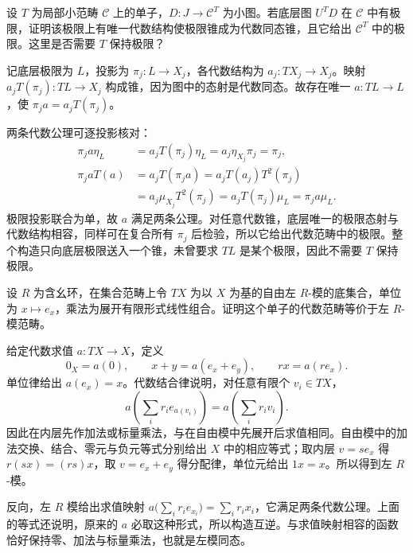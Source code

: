 \begin{exercise}\label{b4:ex:A-em-limits}
	设 \(T\) 为局部小范畴 \(\mathcal C\) 上的单子，\(D:J\to\mathcal C^T\) 为小图。若底层图 \(U^TD\) 在 \(\mathcal C\) 中有极限，证明该极限上有唯一代数结构使极限锥成为代数同态锥，且它给出 \(\mathcal C^T\) 中的极限。这里是否需要 \(T\) 保持极限？
\end{exercise}
\begin{solution}
	记底层极限为 \(L\)，投影为 \(\pi_j:L\to X_j\)，各代数结构为 \(a_j:TX_j\to X_j\)。映射 \(a_jT(\pi_j):TL\to X_j\) 构成锥，因为图中的态射是代数同态。故存在唯一 \(a:TL\to L\)，使 \(\pi_ja=a_jT(\pi_j)\)。

	两条代数公理可逐投影核对：
	\[
		\begin{aligned}
			\pi_ja\eta_L&=a_jT(\pi_j)\eta_L=a_j\eta_{X_j}\pi_j=\pi_j,\\
			\pi_jaT(a)&=a_jT(\pi_ja)=a_jT(a_j)T^2(\pi_j)\\
			&=a_j\mu_{X_j}T^2(\pi_j)=a_jT(\pi_j)\mu_L=\pi_ja\mu_L.
		\end{aligned}
	\]极限投影联合为单，故 \(a\) 满足两条公理。对任意代数锥，底层唯一的极限态射与代数结构相容，同样可在复合所有 \(\pi_j\) 后检验，所以它给出代数范畴中的极限。整个构造只向底层极限送入一个锥，未曾要求 \(TL\) 是某个极限，因此不需要 \(T\) 保持极限。
\end{solution}

\begin{exercise}\label{b4:ex:A-free-module-monad}
	设 \(R\) 为含幺环，在集合范畴上令 \(TX\) 为以 \(X\) 为基的自由左 \(R\)-模的底集合，单位为 \(x\mapsto e_x\)，乘法为展开有限形式线性组合。证明这个单子的代数范畴等价于左 \(R\)-模范畴。
\end{exercise}
\begin{solution}
	给定代数求值 \(a:TX\to X\)，定义
	\[
		0_X=a(0),\qquad x+y=a(e_x+e_y),\qquad rx=a(re_x).
	\]
	单位律给出 \(a(e_x)=x\)。代数结合律说明，对任意有限个 \(v_i\in TX\)，
	\[
		a\left(\sum_i r_i e_{a(v_i)}\right) =a\left(\sum_i r_i v_i\right).
	\]
	因此在内层先作加法或标量乘法，与在自由模中先展开后求值相同。自由模中的加法交换、结合、零元与负元等式分别给出 \(X\) 中的相应等式；取内层 \(v=se_x\) 得 \(r(sx)=(rs)x\)，取 \(v=e_x+e_y\) 得分配律，单位元给出 \(1x=x\)。所以得到左 \(R\)-模。

	反向，左 \(R\) 模给出求值映射 \(a\bigl(\sum_i r_i e_{x_i}\bigr)=\sum_i r_i x_i\)，它满足两条代数公理。上面的等式还说明，原来的 \(a\) 必取这种形式，所以构造互逆。与求值映射相容的函数恰好保持零、加法与标量乘法，也就是左模同态。
\end{solution}


